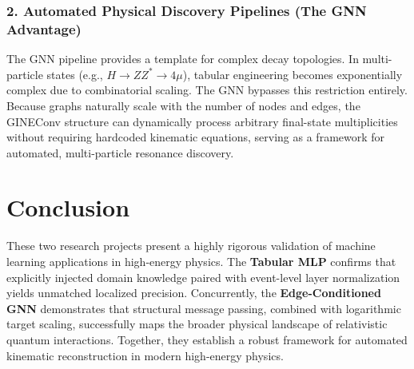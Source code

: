 \documentclass[11pt,a4paper,oneside]{article}
\begin{document}
\subsubsection*{2. Automated Physical Discovery Pipelines (The GNN Advantage)}
The GNN pipeline provides a template for complex decay topologies. In multi-particle states (e.g., $H \rightarrow Z Z^* \rightarrow 4\mu$), tabular engineering becomes exponentially complex due to combinatorial scaling. The GNN bypasses this restriction entirely. Because graphs naturally scale with the number of nodes and edges, the GINEConv structure can dynamically process arbitrary final-state multiplicities without requiring hardcoded kinematic equations, serving as a framework for automated, multi-particle resonance discovery.

\section{Conclusion}

These two research projects present a highly rigorous validation of machine learning applications in high-energy physics. The \textbf{Tabular MLP} confirms that explicitly injected domain knowledge paired with event-level layer normalization yields unmatched localized precision. Concurrently, the \textbf{Edge-Conditioned GNN} demonstrates that structural message passing, combined with logarithmic target scaling, successfully maps the broader physical landscape of relativistic quantum interactions. Together, they establish a robust framework for automated kinematic reconstruction in modern high-energy physics.
\end{document}
